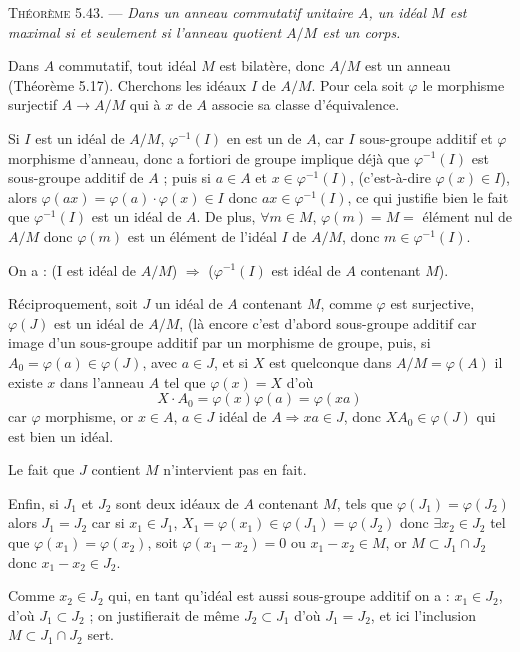\medskip\noindent\textsc{Théorème 5.43.} --- \emph{Dans un anneau commutatif unitaire $A$, un idéal $M$ est maximal si et seulement si l'anneau quotient $A/M$ est un corps.}

Dans $A$ commutatif, tout idéal $M$ est bilatère, donc $A/M$ est un anneau (Théorème 5.17). Cherchons les idéaux $I$ de $A/M$. Pour cela soit $\varphi$ le morphisme surjectif $A\to A/M$ qui à $x$ de $A$ associe sa classe d'équivalence.

Si $I$ est un idéal de $A/M$, $\varphi^{-1}(I)$ en est un de $A$, car $I$ sous-groupe additif et $\varphi$ morphisme d'anneau, donc a fortiori de groupe implique déjà que $\varphi^{-1}(I)$ est sous-groupe additif de $A$ ; puis si $a\in A$ et $x\in\varphi^{-1}(I)$, (c'est-à-dire $\varphi(x)\in I$), alors $\varphi(ax)=\varphi(a)\cdot\varphi(x)\in I$ donc $ax\in\varphi^{-1}(I)$, ce qui justifie bien le fait que $\varphi^{-1}(I)$ est un idéal de $A$. De plus, $\forall m\in M$, $\varphi(m)=M=$ élément nul de $A/M$ donc $\varphi(m)$ est un élément de l'idéal $I$ de $A/M$, donc $m\in\varphi^{-1}(I)$.

On a : (I est idéal de $A/M$) $\Rightarrow$ ($\varphi^{-1}(I)$ est idéal de $A$ contenant $M$).

Réciproquement, soit $J$ un idéal de $A$ contenant $M$, comme $\varphi$ est surjective, $\varphi(J)$ est un idéal de $A/M$, (là encore c'est d'abord sous-groupe additif car image d'un sous-groupe additif par un morphisme de groupe, puis, si $A_0=\varphi(a)\in\varphi(J)$, avec $a\in J$, et si $X$ est quelconque dans $A/M=\varphi(A)$ il existe $x$ dans l'anneau $A$ tel que $\varphi(x)=X$ d'où
\[
X\cdot A_0=\varphi(x)\varphi(a)=\varphi(xa)
\]
car $\varphi$ morphisme, or $x\in A$, $a\in J$ idéal de $A\Rightarrow xa\in J$, donc $XA_0\in\varphi(J)$ qui est bien un idéal.

Le fait que $J$ contient $M$ n'intervient pas en fait.

Enfin, si $J_1$ et $J_2$ sont deux idéaux de $A$ contenant $M$, tels que $\varphi(J_1)=\varphi(J_2)$ alors $J_1=J_2$ car si $x_1\in J_1$, $X_1=\varphi(x_1)\in\varphi(J_1)=\varphi(J_2)$ donc $\exists x_2\in J_2$ tel que $\varphi(x_1)=\varphi(x_2)$, soit $\varphi(x_1-x_2)=0$ ou $x_1-x_2\in M$, or $M\subset J_1\cap J_2$ donc $x_1-x_2\in J_2$.

Comme $x_2\in J_2$ qui, en tant qu'idéal est aussi sous-groupe additif on a : $x_1\in J_2$, d'où $J_1\subset J_2$ ; on justifierait de même $J_2\subset J_1$ d'où $J_1=J_2$, et ici l'inclusion $M\subset J_1\cap J_2$ sert.

